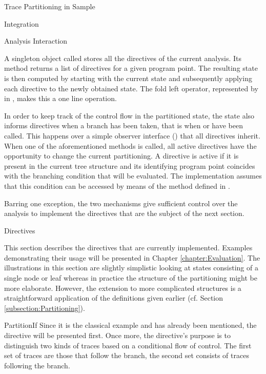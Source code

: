 \begin{chapter}{Trace Partitioning in Sample}
\begin{section}{Integration}
\begin{subsection}{Analysis Interaction}
			

			A singleton object called  stores all the directives of the current analysis. Its  method returns a list of directives for a given program point. The resulting state is then computed by starting with the current state and subsequently applying each directive to the newly obtained state. The fold left operator, represented by \code{/:} in \scala, makes this a one line operation.

			In order to keep track of the control flow in the partitioned state, the state also informs directives when a branch has been taken, that is when  or  have been called. This happens over a simple observer interface () that all directives inherit. When one of the aforementioned methods is called, all active directives have the opportunity to change the current partitioning. A directive is active if it is present in the current tree structure and its identifying program point coincides with the branching condition that will be evaluated. The implementation assumes that this condition can be accessed by means of the  method defined in .
			
			Barring one exception, the two mechanisms give sufficient control over the analysis to implement the directives that are the subject of the next section.
		\end{subsection}
	\end{section}


	\begin{section}{Directives}
		\label{section:Directives}
		
		This section describes the directives that are currently implemented. Examples demonstrating their usage will be presented in Chapter \ref{chapter:Evaluation}. The illustrations in this section are slightly simplistic looking at states consisting of a single node or leaf whereas in practice the structure of the partitioning might be more elaborate. However, the extension to more complicated structures is a straightforward application of the definitions given earlier (cf. Section \ref{subsection:Partitioning}).


		\begin{subsection}{PartitionIf}
			Since it is the classical example and has already been mentioned, the  directive will be presented first. Once more, the directive's purpose is to distinguish two kinds of traces based on a conditional flow of control. The first set of traces are those that follow the  branch, the second set consists of traces following the  branch.


\end{subsection}
\end{section}
\end{chapter}
